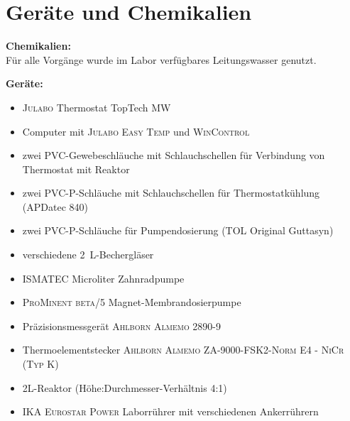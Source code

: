 \section{Geräte und Chemikalien}
\label{sec:geraete}

\textbf{Chemikalien:}\\
Für alle Vorgänge wurde im Labor verfügbares Leitungswasser genutzt.

\newpage

\textbf{Geräte:}
\begin{itemize}
	\item \textsc{Julabo} Thermostat TopTech MW
	\item Computer mit \textsc{Julabo Easy Temp} und \textsc{WinControl} \cite{Easytemp, Wincontrol}
	\item zwei PVC-Gewebeschläuche mit Schlauchschellen für Verbindung von Thermostat mit Reaktor
	\item zwei PVC-P-Schläuche mit Schlauchschellen für Thermostatkühlung (APDatec 840) 
	\item zwei PVC-P-Schläuche für Pumpendosierung (TOL Original Guttasyn)
	\item verschiedene \SI{2}{\liter}-Bechergläser
	\item \textsc{ISMATEC} Microliter Zahnradpumpe
	\item \textsc{ProMinent beta/5} Magnet-Membrandosierpumpe 
	\item Präzisionsmessgerät \textsc{Ahlborn Almemo 2890-9}
	\item Thermoelementstecker \textsc{Ahlborn Almemo ZA-9000-FSK2-Norm E4 - NiCr (Typ K)}
	\item 2L-Reaktor (Höhe:Durchmesser-Verhältnis 4:1)
	\item \textsc{IKA Eurostar Power} Laborrührer mit verschiedenen Ankerrührern
\end{itemize}